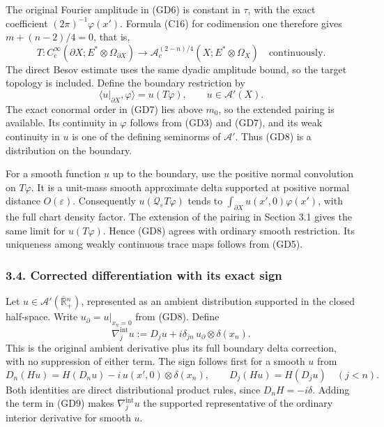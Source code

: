 \documentclass[
  11pt,
]{article}
\begin{document}
The original Fourier amplitude in (GD6) is constant in \(\tau\), with
the exact coefficient \((2\pi)^{-1}\varphi(x')\). Formula (C16) for
codimension one therefore gives \(m+(n-2)/4=0\), that is, \[
 T:C_c^\infty(\partial X;E^*\otimes\Omega_{\partial X})
       \longrightarrow
       \mathcal A^{(2-n)/4}_c(X;E^*\otimes\Omega_X)
 \quad\text{continuously}.
 \tag{GD7}
\] The direct Besov estimate uses the same dyadic amplitude bound, so
the target topology is included. Define the boundary restriction by \[
 \langle u|_{\partial X},\varphi\rangle=u(T\varphi),
 \qquad u\in\mathcal A'(X).
 \tag{GD8}
\] The exact conormal order in (GD7) lies above \(m_0\), so the extended
pairing is available. Its continuity in \(\varphi\) follows from (GD3)
and (GD7), and its weak continuity in \(u\) is one of the defining
seminorms of \(\mathcal A'\). Thus (GD8) is a distribution on the
boundary.

For a smooth function \(u\) up to the boundary, use the positive normal
convolution on \(T\varphi\). It is a unit-mass smooth approximate delta
supported at positive normal distance \(O(\varepsilon)\). Consequently
\(u(\mathcal Q_\varepsilon T\varphi)\) tends to
\(\int_{\partial X}u(x',0)\varphi(x')\), with the full chart density
factor. The extension of the pairing in Section 3.1 gives the same limit
for \(u(T\varphi)\). Hence (GD8) agrees with ordinary smooth
restriction. Its uniqueness among weakly continuous trace maps follows
from (GD5).

\subsubsection{3.4. Corrected differentiation with its exact
sign}\label{corrected-differentiation-with-its-exact-sign}

Let \(u\in\mathcal A'(\overline{\mathbb R}{}^n_+)\), represented as an
ambient distribution supported in the closed half-space. Write
\(u_\partial=u|_{x_n=0}\) from (GD8). Define \[
 \nabla_j^\mathrm{int}u
   :=D_j u+i\delta_{jn}\,u_\partial\otimes\delta(x_n).
 \tag{GD9}
\] This is the original ambient derivative plus its full boundary delta
correction, with no suppression of either term. The sign follows first
for a smooth \(u\) from \[
 D_n(Hu) = H(D_nu)-i\,u(x',0)\otimes\delta(x_n),
 \qquad
 D_j(Hu)=H(D_ju)\quad(j<n).
 \tag{GD10}
\] Both identities are direct distributional product rules, since
\(D_nH=-i\delta\). Adding the term in (GD9) makes
\(\nabla_j^\mathrm{int}u\) the supported representative of the ordinary
interior derivative for smooth \(u\).
\end{document}
